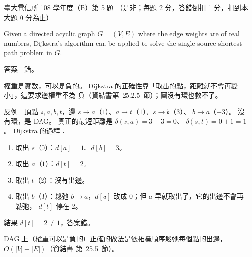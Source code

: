 \begin{pastexam}[label={px:ntu-108-comm-dsab-05}]{臺大電信所 108 學年度（B）第 5 題}
（是非；每題 2 分，答錯倒扣 1 分，扣到本大題 0 分為止）

Given a directed acyclic graph $G=(V,E)$ where the edge weights are of real numbers, Dijkstra's
algorithm can be applied to solve the single-source shortest-path problem in $G$.
\end{pastexam}

\begin{pastsoln}
答案：錯。

權重是實數，可以是負的。 Dijkstra 的正確性靠「取出的點，距離就不會再變小」，這要求邊權重不為
負（資結書第~25.2.5~節）；圖沒有環也救不了。

反例：頂點 $s, a, b, t$，邊 $s \to a$（$1$）、$a \to t$（$1$）、$s \to b$（$3$）、
$b \to a$（$-3$）。 沒有環，是 DAG。 真正的最短距離是 $\delta(s, a) = 3 - 3 = 0$、
$\delta(s, t) = 0 + 1 = 1$。 Dijkstra 的過程：
\begin{enumerate}
\item 取出 $s$（$0$）：$d[a] = 1$、$d[b] = 3$。
\item 取出 $a$（$1$）：$d[t] = 2$。
\item 取出 $t$（$2$）：沒有出邊。
\item 取出 $b$（$3$）：鬆弛 $b \to a$，$d[a]$ 改成 $0$；但 $a$ 早就取出了，它的出邊不會再鬆弛，
$d[t]$ 停在 $2$。
\end{enumerate}
結果 $d[t] = 2 \ne 1$，答案錯。

DAG 上（權重可以是負的）正確的做法是依拓樸順序鬆弛每個點的出邊，$O(|V| + |E|)$（資結書
第~25.5~節）。
\end{pastsoln}
